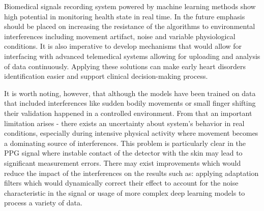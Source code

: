 \documentclass[journal]{IEEEtran}
\begin{document}
Biomedical signals recording system powered by machine learning methods show high potential in monitoring health state in real time. In the future emphasis should be placed on increasing the resistance of the algorithms to environmental interferences including movement artifact, noise and variable physiological conditions. It is also imperative to develop mechanisms that would allow for interfacing with advanced telemedical systems allowing for uploading and analysis of data continuously. Applying these solutions can make early heart disorders identification easier and support clinical decision-making process.

It is worth noting, however, that although the models have been trained on data that included interferences like sudden bodily movements or small finger shifting their validation happened in a controlled environment. From that an important limitation arises - there exists an uncertainty about system's behavior in real conditions, especially during intensive physical activity where movement becomes a dominating source of interferences. This problem is particularly clear in the PPG signal where instable contact of the detector with the skin may lead to significant measurement errors. There may exist improvements which would reduce the impact of the interferences on the results such as: applying adaptation filters which would dynamically correct their effect to account for the noise characteristic in the signal or usage of more complex deep learning models to process a variety of data.
\end{document}
